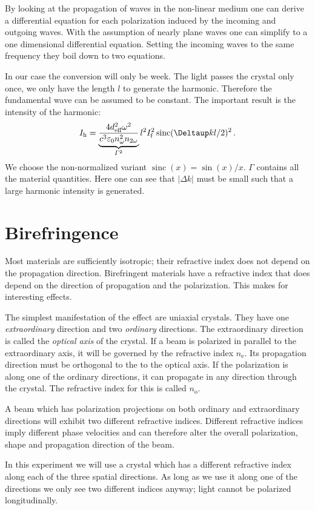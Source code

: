 \documentclass[11pt, english, fleqn, DIV=15, headinclude, BCOR=2cm]{scrreprt}
\DeclareMathOperator\sinc{sinc}
\begin{document}
By looking at the propagation of waves in the non-linear medium one can derive
a differential equation for each polarization induced by the incoming and
outgoing waves. With the assumption of nearly plane waves one can simplify to a
one dimensional differential equation. Setting the incoming waves to the same
frequency they boil down to two equations.

In our case the conversion will only be week. The light passes the crystal only
once, we only have the length $l$ to generate the harmonic. Therefore the
fundamental wave can be assumed to be constant. The important result is the
intensity of the harmonic:
\[
    I_\text h = \underbrace{\frac{4 d_\text{eff}^2 \omega^2}{c^3 \varepsilon_0
    n_\omega^2 n_{2\omega}}}_{\Gamma^2} l^2 I_\mathrm f^2 \sinc(\Deltaup k l /
    2)^2 \,.
\]
We choose the non-normalized variant $\sinc(x) = \sin(x)/x$. $\Gamma$ contains
all the material quantities. Here one can see that $|\Delta k|$ must be small
such that a large harmonic intensity is generated.

\section{Birefringence}

Most materials are sufficiently isotropic; their refractive index does not
depend on the propagation direction. Birefringent materials have a refractive
index that does depend on the direction of propagation and the polarization.
This makes for interesting effects.

The simplest manifestation of the effect are uniaxial crystals. They have one
\emph{extraordinary} direction and two \emph{ordinary} directions. The
extraordinary direction is called the \emph{optical axis} of the crystal. If a
beam is polarized in parallel to the extraordinary axis, it will be governed by
the refractive index $n_\mathrm e$. Its propagation direction must be
orthogonal to the to the optical axis. If the polarization is along one of the
ordinary directions, it can propagate in any direction through the crystal. The
refractive index for this is called $n_\mathrm o$.

A beam which has polarization projections on both ordinary and extraordinary
directions will exhibit two different refractive indices. Different refractive
indices imply different phase velocities and can therefore alter the overall
polarization, shape and propagation direction of the beam.

In this experiment we will use a crystal which has a different refractive index
along each of the three spatial directions. As long as we use it along one of
the directions we only see two different indices anyway; light cannot be
polarized longitudinally.
\end{document}
